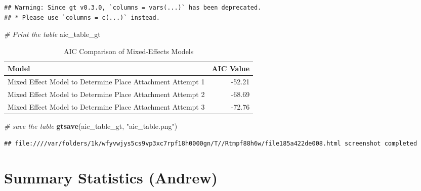 \documentclass[
]{article}
\newenvironment{Shaded}{\begin{snugshade}}{\end{snugshade}}
\newcommand{\CommentTok}[1]{\textcolor[rgb]{0.56,0.35,0.01}{\textit{#1}}}
\newcommand{\FunctionTok}[1]{\textcolor[rgb]{0.13,0.29,0.53}{\textbf{#1}}}
\newcommand{\NormalTok}[1]{#1}
\newcommand{\StringTok}[1]{\textcolor[rgb]{0.31,0.60,0.02}{#1}}
\begin{document}
\begin{verbatim}
## Warning: Since gt v0.3.0, `columns = vars(...)` has been deprecated.
## * Please use `columns = c(...)` instead.
\end{verbatim}

\begin{Shaded}
\begin{Highlighting}[]
\CommentTok{\# Print the table}
\NormalTok{aic\_table\_gt}
\end{Highlighting}
\end{Shaded}

\begin{table}[!t]
\caption*{
{\large AIC Comparison of Mixed-Effects Models}
} 
\fontsize{12.0pt}{14.4pt}\selectfont
\begin{tabular*}{\linewidth}{@{\extracolsep{\fill}}lr}
\toprule
Model & AIC Value \\ 
\midrule\addlinespace[2.5pt]
Mixed Effect Model to Determine Place Attachment Attempt 1 & -52.21 \\ 
Mixed Effect Model to Determine Place Attachment Attempt 2 & -68.69 \\ 
Mixed Effect Model to Determine Place Attachment Attempt 3 & -72.76 \\ 
\bottomrule
\end{tabular*}
\end{table}

\begin{Shaded}
\begin{Highlighting}[]
\CommentTok{\# save the table }
\FunctionTok{gtsave}\NormalTok{(aic\_table\_gt, }\StringTok{"aic\_table.png"}\NormalTok{)}
\end{Highlighting}
\end{Shaded}

\begin{verbatim}
## file:////var/folders/1k/wfyvwjys5cs9vp3xc7rpf18h0000gn/T//Rtmpf88h6w/file185a422de008.html screenshot completed
\end{verbatim}

\section{Summary Statistics (Andrew)}\label{summary-statistics-andrew}
\end{document}
